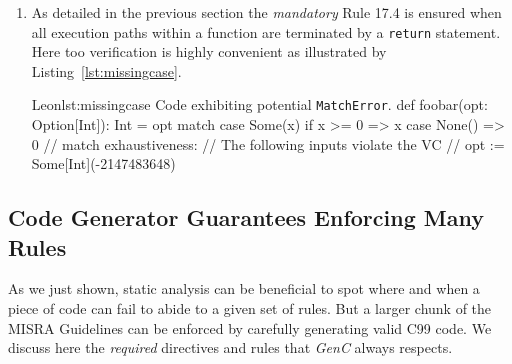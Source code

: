\documentclass[a4paper,twoside]{article}
\newcommand{\InlineC}[1]{\lstinline[language=C99]|#1|}
\newcommand{\InlineS}[1]{\lstinline[language=Leon]|#1|}
\newcommand{\GenC}{\emph{GenC}\xspace}
\newcommand{\RefCode}[1]{Listing~\ref{#1}}
\begin{document}
\begin{enumerate}
\item As detailed in the previous section the \emph{mandatory} Rule 17.4 is
ensured when all execution paths within a function are terminated by a
\InlineC{return} statement. Here too verification is highly convenient as
illustrated by \RefCode{lst:missingcase}.

\begin{Code}{Leon}{lst:missingcase}{%
Code exhibiting potential \InlineS{MatchError}.}
def foobar(opt: Option[Int]): Int = opt match {
  case Some(x) if x >= 0 => x
  case None()            => 0
  // match exhaustiveness:
  //   The following inputs violate the VC
  //   opt := Some[Int](-2147483648)
}
\end{Code}

\end{enumerate}

\subsection{Code Generator Guarantees Enforcing Many Rules}
\label{guaranteed_rules}

As we just shown, static analysis can be beneficial to spot where and when a
piece of code can fail to abide to a given set of rules. But a larger chunk of
the MISRA Guidelines can be enforced by carefully generating valid C99 code. We
discuss here the \emph{required} directives and rules that \GenC always
respects.
\end{document}
